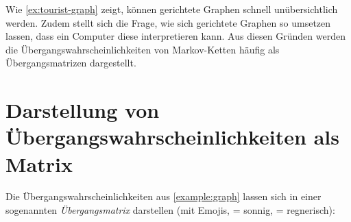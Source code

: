 Wie \cref{ex:tourist-graph} zeigt, können gerichtete Graphen schnell unübersichtlich werden. Zudem stellt sich die Frage, wie sich gerichtete Graphen so umsetzen lassen, dass ein Computer diese interpretieren kann. Aus diesen Gründen werden die Übergangswahrscheinlichkeiten von Markov-Ketten häufig als Übergangsmatrizen dargestellt.

\section{Darstellung von Übergangswahrscheinlichkeiten als Matrix}
\begin{myexample}[Übergangsmatrix]\label{example:matrix}

Die Übergangswahrscheinlichkeiten aus \cref{example:graph} lassen sich in einer sogenannten \emph{Übergangsmatrix} darstellen (mit Emojis,  = sonnig,  = regnerisch):

\begin{center}
    \begin{minipage}{0.25\textwidth}
        \begin{figure}[H]
            \centering
\end{figure}
\end{minipage}
\end{center}
\end{myexample}
